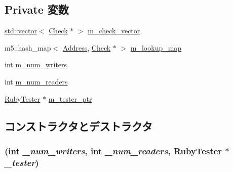 \subsection*{Private 変数}
\begin{DoxyCompactItemize}
\item 
\hyperlink{classstd_1_1vector}{std::vector}$<$ \hyperlink{classCheck}{Check} $\ast$ $>$ \hyperlink{classCheckTable_ace539dad76cd6cc52c665170d8a81286}{m\_\-check\_\-vector}
\item 
m5::hash\_\-map$<$ \hyperlink{classAddress}{Address}, \hyperlink{classCheck}{Check} $\ast$ $>$ \hyperlink{classCheckTable_a3d7090a34667b11d65c47adaf7c220da}{m\_\-lookup\_\-map}
\item 
int \hyperlink{classCheckTable_aedeaccd67403213e1e43d99ff1c70f44}{m\_\-num\_\-writers}
\item 
int \hyperlink{classCheckTable_a7d224a04c5f0d1049dd6c6ab070884cb}{m\_\-num\_\-readers}
\item 
\hyperlink{classRubyTester}{RubyTester} $\ast$ \hyperlink{classCheckTable_aaff3af064462a4d4b7f986a4a2454ff0}{m\_\-tester\_\-ptr}
\end{DoxyCompactItemize}


\subsection{コンストラクタとデストラクタ}
\hypertarget{classCheckTable_aed6c2bde7c6c92e895bdf796e49c9d57}{
\subsubsection[{CheckTable}]{ (int {\em \_\-num\_\-writers}, \/  int {\em \_\-num\_\-readers}, \/  {\bf RubyTester} $\ast$ {\em \_\-tester})}}
\label{classCheckTable_aed6c2bde7c6c92e895bdf796e49c9d57}



